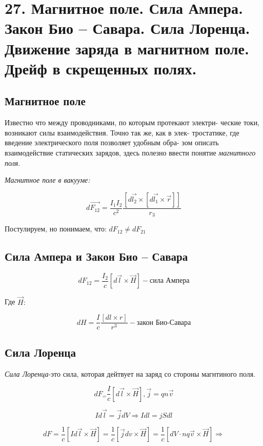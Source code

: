 \section*{27. Магнитное поле. Сила Ампера. Закон Био – Савара. Сила Лоренца.
Движение заряда в магнитном поле. Дрейф в скрещенных полях.}
 
\subsection*{Магнитное поле}


Известно что между проводниками, по которым протекают электри-
ческие токи, возникают силы взаимодействия. Точно так же, как в элек-
тростатике, где введение электрического поля позволяет удобным обра-
зом описать взаимодействие статических зарядов, здесь полезно ввести
понятие \textit{магнитного поля}.

\textit{Магнитное поле в вакууме:}


\[
d\vec{F_{12}}= \frac{I_1 I_2 }{c^2} \frac{[d\vec{l_2}\times [d\vec{l_1}\times \vec{r}]]}{r_{3}}  
\]

Постулируем, но понимаем, что: $dF_{12}\neq dF_{21}$

\subsection*{Сила Ампера и Закон Био – Савара}

\[
dF_{12}=\frac{I_2}{c}[d\vec{l}\times \vec{H}]-\textit{сила Ампера}  
\]

Где $\vec{H}:$

\[
dH=\frac{I}{c} \frac{[dl \times r]}{r^3} - \textit{закон Био-Савара}  
\]

\subsection*{Сила Лоренца}


\textit{Сила Лоренца}-это сила, которая дейтвует на заряд со стороны магнтиного поля. 

\[
    dF_=\frac{I}{c}[d\vec{l}\times \vec{H}],\vec{j}=qn\vec{v}
\]

\[
Id\vec{l}=\vec{j}dV \Rightarrow Idl=jSdl
\]

\[
dF=\frac{1}{c}[Id\vec{l}\times \vec{H}]=\frac{1}{c}[\vec{j}dv \times \vec{H}]=\frac{1}{c} [dV\cdot nq\vec{v}\times \vec{H} ] \Rightarrow 
\]

